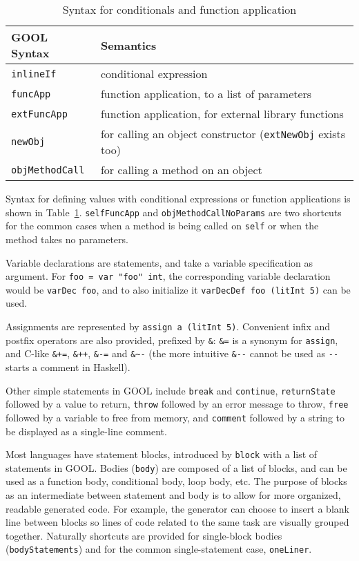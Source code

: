 \documentclass[sigplan,review,anonymous,prologue,dvipsnames]{acmart}
\begin{document}
\begin{table}[!h]
  \caption{Syntax for conditionals and function application}
  \begin{tabular}{p{} p{}}
    \textbf{GOOL Syntax} & \textbf{Semantics} \\
    \midrule
    \verb|inlineIf| & conditional expression \\
    \verb|funcApp| & function application, to a list of parameters \\
    \verb|extFuncApp| & function application, for external library
    functions\\
    \verb|newObj| & for calling an object constructor (\verb|extNewObj|
    exists too) \\
    \verb|objMethodCall| & for calling a method on an object \\
  \end{tabular}
  \label{tab:values}
\end{table}

Syntax for defining values with conditional expressions or function
applications is shown in Table~\ref{tab:values}. \verb|selfFuncApp| and
\verb|objMethodCallNoParams| are two shortcuts for the common cases when a
method is being called on \verb|self| or when the method takes no parameters.

Variable declarations are statements, and take a variable specification
as argument. For \verb|foo = var "foo" int|, the corresponding variable
declaration would be \verb|varDec foo|, and to also initialize it
\verb|varDecDef foo (litInt 5)| can be used.

Assignments are represented by \verb|assign a (litInt 5)|. Convenient
infix and postfix operators are also provided, prefixed by \verb|&|:
\verb|&=| is a synonym for \verb|assign|, and C-like
\verb|&+=|, \verb|&++|, \verb|&-=| and \verb|&~-| (the more intuitive
\verb|&--| cannot be used as \verb|--| starts a comment in Haskell).

Other simple statements in GOOL include \verb|break| and \verb|continue|,
\verb|returnState| followed by a value to return, \verb|throw| followed by an
error message to throw, \verb|free| followed by a variable to free from
memory, and \verb|comment| followed by a string to be displayed as a
single-line comment.

Most languages have statement blocks, introduced by \verb|block| with
a list of statements in GOOL. Bodies (\verb|body|) are composed
of a list of blocks, and can be used as a function body, conditional body, loop
body, etc. The purpose of blocks as an intermediate between statement and body
is to allow for more organized, readable generated code. For example, the
generator can choose to insert a blank line between blocks so lines of code
related to the same task are visually grouped together. Naturally shortcuts
are provided for single-block bodies (\verb|bodyStatements|) and
for the common single-statement case, \verb|oneLiner|.
\end{document}
